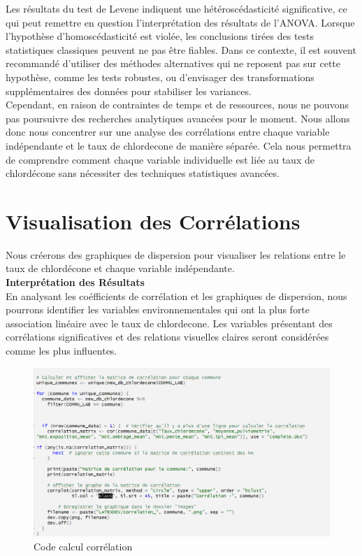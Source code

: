 \documentclass{report}
\begin{document}
Les résultats du test de Levene indiquent une hétéroscédasticité significative, ce qui peut remettre en question l'interprétation des résultats de l'ANOVA. Lorsque l'hypothèse d'homoscédasticité est violée, les conclusions tirées des tests statistiques classiques peuvent ne pas être fiables. Dans ce contexte, il est souvent recommandé d'utiliser des méthodes alternatives qui ne reposent pas sur cette hypothèse, comme les tests robustes, ou d'envisager des transformations supplémentaires des données pour stabiliser les variances.\\

Cependant, en raison de contraintes de temps et de ressources, nous ne pouvons pas poursuivre des recherches analytiques avancées pour le moment. Nous allons donc nous concentrer sur une analyse des corrélations entre chaque variable indépendante et le taux de chlordecone de manière séparée. Cela nous permettra de comprendre comment chaque variable individuelle est liée au taux de chlordécone sans nécessiter des techniques statistiques avancées.\\


\section*{Visualisation des Corrélations}

Nous créerons des graphiques de dispersion pour visualiser les relations entre le taux de chlordécone et chaque variable indépendante.\\

\Large\textbf{Interprétation des Résultats}\\
En analysant les coéfficients de corrélation et les graphiques de dispersion, nous pourrons identifier les variables environnementales qui ont la plus forte association linéaire avec le taux de chlordecone. Les variables présentant des corrélations significatives et des relations visuelles claires seront considérées comme les plus influentes.\\


\begin{figure}[H]
\centering
\includegraphics[width = 1
\linewidth]{codecorr.png}
\caption{Code calcul corrélation}
\end{figure}
\end{document}
